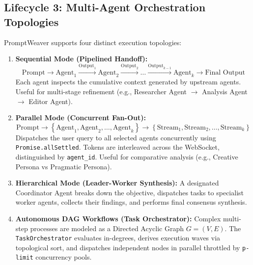 \documentclass[10pt,a4paper]{article}
\begin{document}
\subsection{Lifecycle 3: Multi-Agent Orchestration Topologies}
PromptWeaver supports four distinct execution topologies:

\begin{enumerate}[leftmargin=*]
    \item \textbf{Sequential Mode (Pipelined Handoff):}
    \begin{equation}
        \text{Prompt} \xrightarrow{} \text{Agent}_1 \xrightarrow{\text{Output}_1} \text{Agent}_2 \xrightarrow{\text{Output}_2} \dots \xrightarrow{\text{Output}_{k-1}} \text{Agent}_k \xrightarrow{} \text{Final Output}
    \end{equation}
    Each agent inspects the cumulative context generated by upstream agents. Useful for multi-stage refinement (e.g., Researcher Agent $\to$ Analysis Agent $\to$ Editor Agent).
    
    \item \textbf{Parallel Mode (Concurrent Fan-Out):}
    \begin{equation}
        \text{Prompt} \xrightarrow{} \left\{ \text{Agent}_1, \text{Agent}_2, \dots, \text{Agent}_k \right\} \xrightarrow{} \left\{ \text{Stream}_1, \text{Stream}_2, \dots, \text{Stream}_k \right\}
    \end{equation}
    Dispatches the user query to all selected agents concurrently using \texttt{Promise.allSettled}. Tokens are interleaved across the WebSocket, distinguished by \texttt{agent\_id}. Useful for comparative analysis (e.g., Creative Persona vs Pragmatic Persona).

    \item \textbf{Hierarchical Mode (Leader-Worker Synthesis):}
    A designated Coordinator Agent breaks down the objective, dispatches tasks to specialist worker agents, collects their findings, and performs final consensus synthesis.

    \item \textbf{Autonomous DAG Workflows (Task Orchestrator):}
    Complex multi-step processes are modeled as a Directed Acyclic Graph $G = (V, E)$. The \texttt{TaskOrchestrator} evaluates in-degrees, derives execution waves via topological sort, and dispatches independent nodes in parallel throttled by \texttt{p-limit} concurrency pools.
\end{enumerate}

\end{document}

